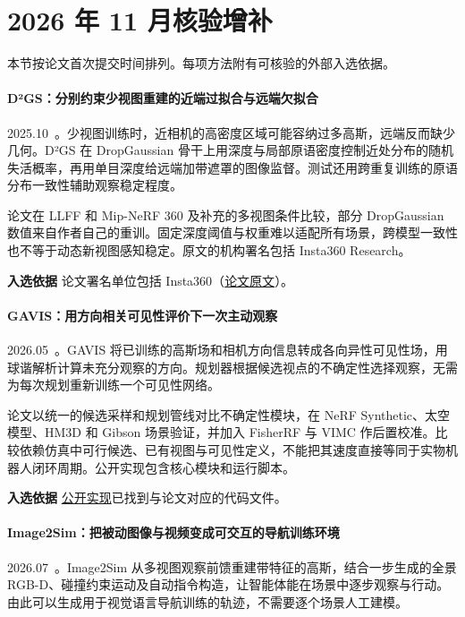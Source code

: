 \section{2026 年 11 月核验增补}

本节按论文首次提交时间排列。每项方法附有可核验的外部入选依据。

\paragraph{D²GS：分别约束少视图重建的近端过拟合与远端欠拟合}
2025.10~\cite{2510_08566}。少视图训练时，近相机的高密度区域可能容纳过多高斯，远端反而缺少几何。D²GS 在 DropGaussian 骨干上用深度与局部原语密度控制近处分布的随机失活概率，再用单目深度给远端加带遮罩的图像监督。测试还用跨重复训练的原语分布一致性辅助观察稳定程度。

论文在 LLFF 和 Mip-NeRF 360 及补充的多视图条件比较，部分 DropGaussian 数值来自作者自己的重训。固定深度阈值与权重难以适配所有场景，跨模型一致性也不等于动态新视图感知稳定。原文的机构署名包括 Insta360 Research。

\textbf{入选依据} 论文署名单位包括 Insta360（\href{https://arxiv.org/html/2510.08566}{论文原文}）。

\paragraph{GAVIS：用方向相关可见性评价下一次主动观察}
2026.05~\cite{2605_30342}。GAVIS 将已训练的高斯场和相机方向信息转成各向异性可见性场，用球谐解析计算未充分观察的方向。规划器根据候选视点的不确定性选择观察，无需为每次规划重新训练一个可见性网络。

论文以统一的候选采样和规划管线对比不确定性模块，在 NeRF Synthetic、太空模型、HM3D 和 Gibson 场景验证，并加入 FisherRF 与 VIMC 作后置校准。比较依赖仿真中可行候选、已有视图与可见性定义，不能把其速度直接等同于实物机器人闭环周期。公开实现包含核心模块和运行脚本。

\textbf{入选依据} \href{https://github.com/xsj01/gavis}{公开实现}已找到与论文对应的代码文件。

\paragraph{Image2Sim：把被动图像与视频变成可交互的导航训练环境}
2026.07~\cite{2607_05765}。Image2Sim 从多视图观察前馈重建带特征的高斯，结合一步生成的全景 RGB-D、碰撞约束运动及自动指令构造，让智能体能在场景中逐步观察与行动。由此可以生成用于视觉语言导航训练的轨迹，不需要逐个场景人工建模。

